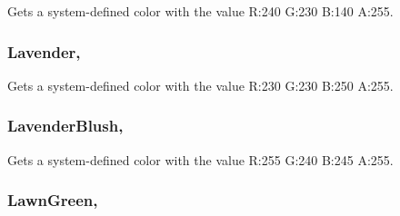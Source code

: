 Gets a system-\/defined color with the value R\+:240 G\+:230 B\+:140 A\+:255.

\hypertarget{structMicrosoft_1_1Xna_1_1Framework_1_1Color_abae8947ec0f84c73eb5efd0e960e590a}{}
\subsubsection[{Lavender}]{ Lavender\hspace{0.3cm}{\ttfamily [static]}, {\ttfamily [get]}}\label{structMicrosoft_1_1Xna_1_1Framework_1_1Color_abae8947ec0f84c73eb5efd0e960e590a}


Gets a system-\/defined color with the value R\+:230 G\+:230 B\+:250 A\+:255.

\hypertarget{structMicrosoft_1_1Xna_1_1Framework_1_1Color_a687b15806e8ae291e6743de27841b7b6}{}
\subsubsection[{Lavender\+Blush}]{ Lavender\+Blush\hspace{0.3cm}{\ttfamily [static]}, {\ttfamily [get]}}\label{structMicrosoft_1_1Xna_1_1Framework_1_1Color_a687b15806e8ae291e6743de27841b7b6}


Gets a system-\/defined color with the value R\+:255 G\+:240 B\+:245 A\+:255.

\hypertarget{structMicrosoft_1_1Xna_1_1Framework_1_1Color_a15de0e383f225ec93280545331558ba9}{}
\subsubsection[{Lawn\+Green}]{ Lawn\+Green\hspace{0.3cm}{\ttfamily [static]}, {\ttfamily [get]}}\label{structMicrosoft_1_1Xna_1_1Framework_1_1Color_a15de0e383f225ec93280545331558ba9}


